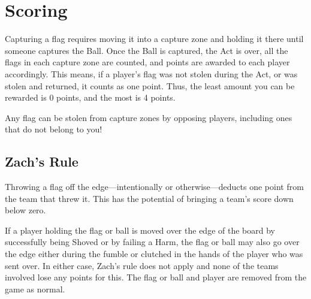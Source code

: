 \section{Scoring} \label{scoring}
Capturing a flag requires moving it into a capture zone and holding it there until someone captures the Ball.
Once the Ball is captured, the Act is over, all the flags in each capture zone are counted, and points are awarded to each player accordingly.
This means, if a player's flag was not stolen during the Act, or was stolen and returned, it counts as one point.
Thus, the least amount you can be rewarded is 0 points, and the most is 4 points.

\begin{note}
    Any flag can be stolen from capture zones by opposing players, including ones that do not belong to you!
\end{note}

\subsection{Zach's Rule}
Throwing a flag off the edge---intentionally or otherwise---deducts one point from the team that threw it.
This has the potential of bringing a team's score down below zero.

\begin{note}
    If a player holding the flag or ball is moved over the edge of the board by successfully being Shoved or by failing a Harm, the flag or ball may also go over the edge either during the fumble or clutched in the hands of the player who was sent over.
    In either case, Zach's rule does not apply and none of the teams involved lose any points for this.
    The flag or ball and player are removed from the game as normal.
\end{note}